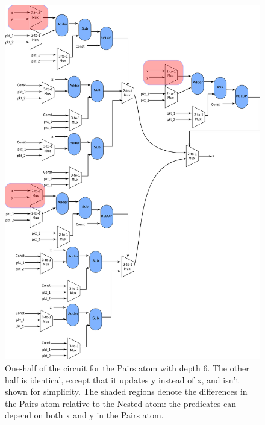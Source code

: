 \newpage
\begin{figure}[!htbp]
  \includegraphics[width=\textwidth]{pairs.pdf}
  \caption{One-half of the circuit for the Pairs atom with depth 6. The other
  half is identical, except that it updates y instead of x, and isn't shown for
simplicity. The shaded regions denote the differences in the Pairs atom
relative to the Nested atom: the predicates can depend on both x and y in the Pairs
atom.}
  \label{fig:sub}
\end{figure}
